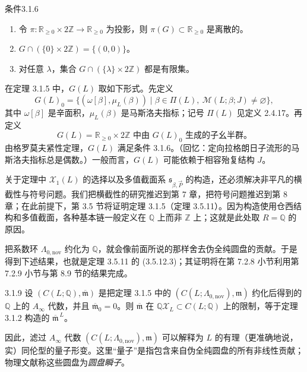 \begin{statement}{条件}{3.1.6}\label{cond:3-1-6}
\begin{enumerate}[label=\textup{(3.1.7.\arabic*)},leftmargin=5.6em]
  \item 令 $\pi\colon\mathbb R_{\geq0}\times2\mathbb Z
  \to\mathbb R_{\geq0}$ 为投影，则
  $\pi(G)\subset\mathbb R_{\geq0}$ 是离散的。
  \item $G\cap(\{0\}\times2\mathbb Z)=\{(0,0)\}$。
  \item 对任意 $\lambda$，集合
  $G\cap(\{\lambda\}\times2\mathbb Z)$ 都是有限集。
\end{enumerate}
\end{statement}

在定理 3.1.5 中，$G(L)$ 取如下形式。先定义
\[
  G(L)_0=\bigl\{(\omega[\beta],\mu_L(\beta))\mid
  \beta\in\Pi(L),\ \mathcal M(L;\beta;J)\neq\varnothing\bigr\},
\]
其中 $\omega[\beta]$ 是辛面积，$\mu_L(\beta)$ 是马斯洛夫指标；记号
$\Pi(L)$ 见定义 2.4.17。再定义
\begin{equation}
  G(L)=\mathbb R_{\geq0}\times2\mathbb Z
  \text{ 中由 }G(L)_0\text{ 生成的子幺半群。}
  \tag{3.1.8}\label{eq:3-1-8}
\end{equation}
由格罗莫夫紧性定理，$G(L)$ 满足条件 3.1.6。（回忆：定向拉格朗日子流形的马斯洛夫指标总是偶数。）一般而言，$G(L)$ 可能依赖于相容殆复结构 $J$。

关于定理中 $\mathcal X_1(L)$ 的选择以及多值截面系
$\mathfrak s_{\beta,\vec P}$ 的构造，还必须解决非平凡的横截性与符号问题。我们把横截性的研究推迟到第 7 章，把符号问题推迟到第 8 章；在此前提下，第 3.5 节将证明定理 3.1.5（定理 3.5.11）。因为构造使用仓西结构和多值截面，各种基本链一般定义在 $\mathbb Q$ 上而非
$\mathbb Z$ 上；这就是此处取 $R=\mathbb Q$ 的原因。

把系数环 $\Lambda_{0,\mathrm{nov}}$ 约化为 $\mathbb Q$，就会像前面所说的那样舍去伪全纯圆盘的贡献。于是得到下述结果，也就是定理 3.5.11 的 (3.5.12.3)；其证明将在第 7.2.8 小节利用第 7.2.9 小节与第 8.9 节的结果完成。

\begin{theorem}{3.1.9}\label{thm:3-1-9}
设 $(C(L;\mathbb Q),\overline{\mathfrak m})$ 是把定理 3.1.5 中的
$(C(L;\Lambda_{0,\mathrm{nov}}),\mathfrak m)$ 约化后得到的
$\mathbb Q$ 上的 $A_\infty$ 代数，并且 $\overline{\mathfrak m}_0=0$。则
$\overline{\mathfrak m}$ 在 $\mathbb Q\mathcal X_L\subset C(L;\mathbb Q)$ 上的限制，等于定理 3.1.2 构造的 $\overline{\mathfrak m}^{\,L}$。
\end{theorem}

因此，滤过 $A_\infty$ 代数
$(C(L;\Lambda_{0,\mathrm{nov}}),\mathfrak m)$ 可以解释为 $L$ 的有理（更准确地说，实）同伦型的量子形变。这里“量子”是指包含来自伪全纯圆盘的所有非线性贡献；物理文献称这些圆盘为\emph{圆盘瞬子}。

